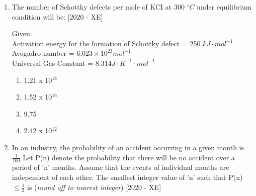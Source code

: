 \documentclass[journal]{IEEEtran}
\begin{document}
\begin{enumerate}
    \item The number of Schottky defects per mole of KCI at 300 $^\circ C$ under equilibrium condition will be: \hfill{[2020 - XE]}
    
    Given:\\
    Activation energy for the formation of Schottky defect = 250 $kJ\cdot mol^{-1}$\\
    Avogadro number =  $6.023 \times 10^23 mol^{-1}$\\
    Universal Gas Constant = $8.314 J\cdot K^{-1}\cdot mol^{-1}$
    \begin{enumerate}
        \item 1.21 x 10$^{18}$
        \item 1.52 x 10$^{16}$
        \item 9.75
        \item 2.42 x 10$^{12}$
    \end{enumerate}
    
    \item In an industry, the probability of an accident occurring in a given month is $\frac{1}{100}$ Let P(n) denote the probability that there will be no accident over a period of 'n' months. Assume that the events of individual months are independent of each other. The smallest integer value of 'n' such that P(n)$\leq \frac{1}{2}$ is \underline{\hspace{3cm}} (\textit{round off to nearest integer}) \hfill{[2020 - XE]}
    

\end{enumerate}
\end{document}
